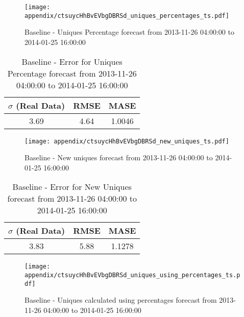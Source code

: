 \begin{figure}[H] \begin{center} \leavevmode
\texttt{[image: appendix/ctsuycHhBvEVbgDBRSd\_uniques\_percentages\_ts.pdf]} \caption[]{
Baseline - Uniques Percentage forecast from 2013-11-26 04:00:00 to 2014-01-25 16:00:00} \label{fig:appendix/ctsuycHhBvEVbgDBRSd_uniques_percentages_ts.pdf} \end{center}
\end{figure}

\begin{table}[H]
\centering
\footnotesize
\begin{tabular}{ccc}
$\sigma$ (Real Data) & RMSE & MASE   \\ \hline
3.69 & 4.64 & 1.0046 \\
\end{tabular}

\vspace{0.5cm}

\caption[]{
Baseline - Error for Uniques Percentage forecast from 2013-11-26 04:00:00 to 2014-01-25 16:00:00}
\end{table}

\begin{figure}[H] \begin{center} \leavevmode
\texttt{[image: appendix/ctsuycHhBvEVbgDBRSd\_new\_uniques\_ts.pdf]} \caption[]{
Baseline - New uniques forecast from 2013-11-26 04:00:00 to 2014-01-25 16:00:00} \label{fig:appendix/ctsuycHhBvEVbgDBRSd_new_uniques_ts.pdf} \end{center}
\end{figure}

\begin{table}[H]
\centering
\footnotesize
\begin{tabular}{ccc}
$\sigma$ (Real Data) & RMSE & MASE   \\ \hline
3.83 & 5.88 & 1.1278 \\
\end{tabular}

\vspace{0.5cm}

\caption[]{
Baseline - Error for New Uniques forecast from 2013-11-26 04:00:00 to 2014-01-25 16:00:00}
\end{table}

\begin{figure}[H] \begin{center} \leavevmode
\texttt{[image: appendix/ctsuycHhBvEVbgDBRSd\_uniques\_using\_percentages\_ts.pdf]} \caption[]{
Baseline - Uniques calculated using percentages forecast from 2013-11-26 04:00:00 to 2014-01-25 16:00:00} \label{fig:appendix/ctsuycHhBvEVbgDBRSd_uniques_using_percentages_ts.pdf} \end{center}
\end{figure}

